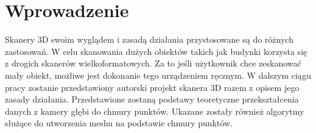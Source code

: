 \section{Wprowadzenie}
Skanery 3D swoim wyglądem i zasadą działania przystosowane są do różnych zastosowań. W celu skanowania dużych obiektów takich jak budynki korzysta się z drogich skanerów wielkoformatowych. Za to jeśli użytkownik chce zeskanować mały obiekt, możliwe jest dokonanie tego urządzeniem ręcznym. W dalszym ciągu pracy zostanie przedstawiony autorski projekt skanera 3D razem z opisem jego zasady działania. Przedstawione zostaną podstawy teoretyczne przekształcenia danych z kamery głębi do chmury punktów. Ukazane zostały również algorytmy służące do utworzenia meshu na podstawie chmury punktów.
